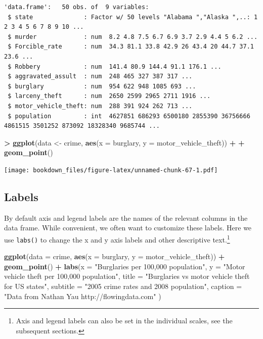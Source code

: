 \documentclass[]{krantz}
\makeatletter
\newenvironment{Shaded}{\begin{snugshade}}{\end{snugshade}}
\newcommand{\KeywordTok}[1]{\textcolor[rgb]{0.27,0.27,0.27}{\textbf{#1}}}
\newcommand{\DataTypeTok}[1]{\textcolor[rgb]{0.27,0.27,0.27}{#1}}
\newcommand{\StringTok}[1]{\textcolor[rgb]{0.5,0.5,0.5}{#1}}
\newcommand{\OperatorTok}[1]{\textcolor[rgb]{0.43,0.43,0.43}{\textbf{#1}}}
\newcommand{\NormalTok}[1]{#1}
\newenvironment{kframe}{%
\medskip{}
\setlength{\fboxsep}{.8em}
 \def\at@end@of@kframe{}%
 \ifinner\ifhmode%
  \def\at@end@of@kframe{\end{minipage}}%
  \begin{minipage}{\columnwidth}%
 \fi\fi%
 \def\FrameCommand##1{\hskip\@totalleftmargin \hskip-\fboxsep
 \colorbox{shadecolor}{##1}\hskip-\fboxsep
     \hskip-\linewidth \hskip-\@totalleftmargin \hskip\columnwidth}%
 \MakeFramed {\advance\hsize-\width
   \@totalleftmargin\z@ \linewidth\hsize
   \@setminipage}}%
 {\par\unskip\endMakeFramed%
 \at@end@of@kframe}
\renewenvironment{Shaded}{\begin{kframe}}{\end{kframe}}
\makeatother
\begin{document}
\begin{verbatim}
'data.frame':   50 obs. of  9 variables:
 $ state              : Factor w/ 50 levels "Alabama ","Alaska ",..: 1 2 3 4 5 6 7 8 9 10 ...
 $ murder             : num  8.2 4.8 7.5 6.7 6.9 3.7 2.9 4.4 5 6.2 ...
 $ Forcible_rate      : num  34.3 81.1 33.8 42.9 26 43.4 20 44.7 37.1 23.6 ...
 $ Robbery            : num  141.4 80.9 144.4 91.1 176.1 ...
 $ aggravated_assult  : num  248 465 327 387 317 ...
 $ burglary           : num  954 622 948 1085 693 ...
 $ larceny_theft      : num  2650 2599 2965 2711 1916 ...
 $ motor_vehicle_theft: num  288 391 924 262 713 ...
 $ population         : int  4627851 686293 6500180 2855390 36756666 4861515 3501252 873092 18328340 9685744 ...
\end{verbatim}

\begin{Shaded}
\begin{Highlighting}[]
\OperatorTok{>}\StringTok{ }\KeywordTok{ggplot}\NormalTok{(data <-}\StringTok{ }\NormalTok{crime, }\KeywordTok{aes}\NormalTok{(}\DataTypeTok{x =}\NormalTok{ burglary, }\DataTypeTok{y =}\NormalTok{ motor_vehicle_theft)) }\OperatorTok{+}\StringTok{ }
\OperatorTok{+}\StringTok{     }\KeywordTok{geom_point}\NormalTok{()}
\end{Highlighting}
\end{Shaded}

\texttt{[image: bookdown\_files/figure-latex/unnamed-chunk-67-1.pdf]}

\subsection{Labels}\label{labels}

By default axis and legend labels are the names of the relevant columns
in the data frame. While convenient, we often want to customize these
labels. Here we use \texttt{labs()} to change the x and y axis labels
and other descriptive text.\footnote{Axis and legend labels can also be
  set in the individual scales, see the subsequent sections.}

\begin{Shaded}
\begin{Highlighting}[]
\KeywordTok{ggplot}\NormalTok{(}\DataTypeTok{data =}\NormalTok{ crime, }\KeywordTok{aes}\NormalTok{(}\DataTypeTok{x =}\NormalTok{ burglary, }\DataTypeTok{y =}\NormalTok{ motor_vehicle_theft)) }\OperatorTok{+}\StringTok{ }
\StringTok{    }\KeywordTok{geom_point}\NormalTok{() }\OperatorTok{+}\StringTok{ }
\StringTok{    }\KeywordTok{labs}\NormalTok{(}\DataTypeTok{x =} \StringTok{"Burglaries per 100,000 population"}\NormalTok{, }
         \DataTypeTok{y =} \StringTok{"Motor vehicle theft per 100,000 population"}\NormalTok{,}
         \DataTypeTok{title =} \StringTok{"Burglaries vs motor vehicle theft for US states"}\NormalTok{,}
         \DataTypeTok{subtitle =} \StringTok{"2005 crime rates and 2008 population"}\NormalTok{,}
         \DataTypeTok{caption =} \StringTok{"Data from Nathan Yau http://flowingdata.com"}
\NormalTok{         )}
\end{Highlighting}
\end{Shaded}
\end{document}
